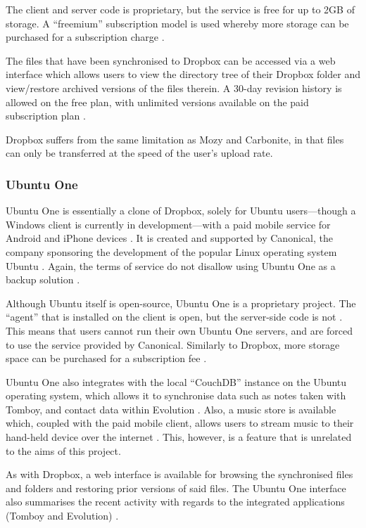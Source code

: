 The client and server code is proprietary, but the service is free for up to
2GB of storage. A ``freemium'' subscription model is used whereby more storage
can be purchased for a subscription charge \cite{Dropbox}.

The files that have been synchronised to Dropbox can be accessed via a web
interface which allows users to view the directory tree of their Dropbox folder
and view/restore archived versions of the files therein. A 30-day revision
history is allowed on the free plan, with unlimited versions available on the
paid subscription plan \cite{Dropbox}.

Dropbox suffers from the same limitation as Mozy and Carbonite, in that files
can only be transferred at the speed of the user's upload rate.

\subsubsection{Ubuntu One}

Ubuntu One is essentially a clone of Dropbox, solely for Ubuntu users---though
a Windows client is currently in development---with a paid mobile service for
Android and iPhone devices \cite{UbuntuOne}. It is created and supported by
Canonical, the company sponsoring the development of the popular Linux
operating system Ubuntu \cite{UbuntuOne}. Again, the terms of service do not
disallow using Ubuntu One as a backup solution \cite{UbuntuOne-terms}.

Although Ubuntu itself is open-source, Ubuntu One is a proprietary project. The
``agent'' that is installed on the client is open, but the server-side code is
not \cite{UbuntuOne-servers}. This means that users cannot run their own Ubuntu
One servers, and are forced to use the service provided by Canonical. Similarly
to Dropbox, more storage space can be purchased for a subscription
fee \cite{UbuntuOne}.

Ubuntu One also integrates with the local ``CouchDB'' instance on the Ubuntu
operating system, which allows it to synchronise data such as notes taken with
Tomboy, and contact data within Evolution \cite{UbuntuOne-couchdb}. Also,
a music store is available which, coupled with the paid mobile client, allows
users to stream music to their hand-held device over the
internet \cite{UbuntuOne}. This, however, is a feature that is unrelated to the
aims of this project.

As with Dropbox, a web interface is available for browsing the synchronised
files and folders and restoring prior versions of said files. The Ubuntu One
interface also summarises the recent activity with regards to the integrated
applications (Tomboy and Evolution) \cite{UbuntuOne}.


